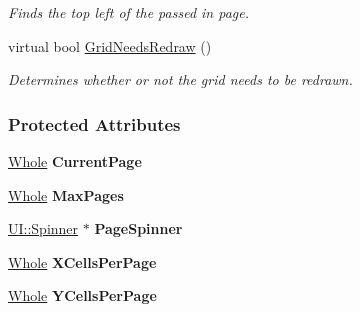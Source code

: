 \begin{DoxyCompactItemize}
\begin{DoxyCompactList}\small\item\em Finds the top left of the passed in page. \item\end{DoxyCompactList}\item 
\hypertarget{classphys_1_1UI_1_1PagedCellGrid_a31d1ab9c67af49b992162e84ad750356}{
virtual bool \hyperlink{classphys_1_1UI_1_1PagedCellGrid_a31d1ab9c67af49b992162e84ad750356}{GridNeedsRedraw} ()}
\label{classphys_1_1UI_1_1PagedCellGrid_a31d1ab9c67af49b992162e84ad750356}

\begin{DoxyCompactList}\small\item\em Determines whether or not the grid needs to be redrawn. \item\end{DoxyCompactList}\end{DoxyCompactItemize}
\subsubsection*{Protected Attributes}
\begin{DoxyCompactItemize}
\item 
\hypertarget{classphys_1_1UI_1_1PagedCellGrid_ae2ce49bd86b1c675b3a0eaef3252a9da}{
\hyperlink{namespacephys_a460f6bc24c8dd347b05e0366ae34f34a}{Whole} {\bfseries CurrentPage}}
\label{classphys_1_1UI_1_1PagedCellGrid_ae2ce49bd86b1c675b3a0eaef3252a9da}

\item 
\hypertarget{classphys_1_1UI_1_1PagedCellGrid_a8154eb0cf03edbe96f59d92b526058ef}{
\hyperlink{namespacephys_a460f6bc24c8dd347b05e0366ae34f34a}{Whole} {\bfseries MaxPages}}
\label{classphys_1_1UI_1_1PagedCellGrid_a8154eb0cf03edbe96f59d92b526058ef}

\item 
\hypertarget{classphys_1_1UI_1_1PagedCellGrid_a07b1db6a9b7adda5b66588fac8c7e4a1}{
\hyperlink{classphys_1_1UI_1_1Spinner}{UI::Spinner} $\ast$ {\bfseries PageSpinner}}
\label{classphys_1_1UI_1_1PagedCellGrid_a07b1db6a9b7adda5b66588fac8c7e4a1}

\item 
\hypertarget{classphys_1_1UI_1_1PagedCellGrid_a914e320c60481730adde14b6db386882}{
\hyperlink{namespacephys_a460f6bc24c8dd347b05e0366ae34f34a}{Whole} {\bfseries XCellsPerPage}}
\label{classphys_1_1UI_1_1PagedCellGrid_a914e320c60481730adde14b6db386882}

\item 
\hypertarget{classphys_1_1UI_1_1PagedCellGrid_a27a1dd0c82747c04b3d4ff7f077f553b}{
\hyperlink{namespacephys_a460f6bc24c8dd347b05e0366ae34f34a}{Whole} {\bfseries YCellsPerPage}}
\label{classphys_1_1UI_1_1PagedCellGrid_a27a1dd0c82747c04b3d4ff7f077f553b}

\end{DoxyCompactItemize}


